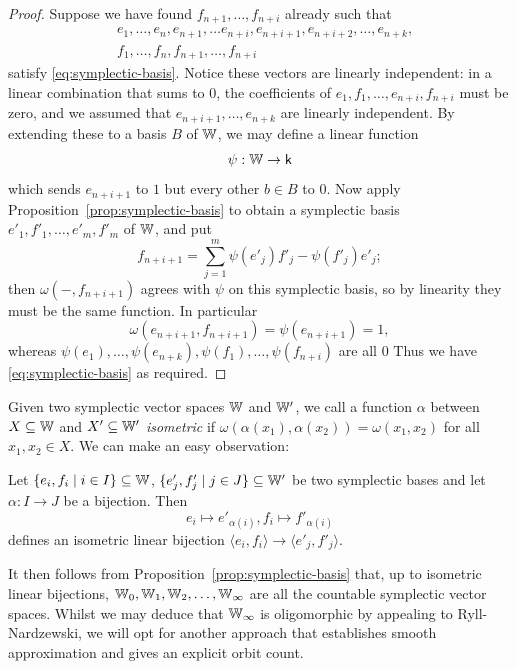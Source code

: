 \begin{proof}
    Suppose we have found $f_{n+1}, \ldots, f_{n+i}$ already such that
    \begin{align*}
        &e_1, \ldots, e_n, e_{n+1}, \ldots e_{n+i}, e_{n+i+1}, e_{n+i+2}, \ldots, e_{n+k},\\ 
        &f_1, \ldots, f_n, f_{n+1}, \ldots, f_{n+i}
    \end{align*}
    satisfy \eqref{eq:symplectic-basis}.
    Notice these vectors are linearly independent:
    in a linear combination that sums to $0$,
    the coefficients of $e_1, f_1, \dots, e_{n+i}, f_{n+i}$ must be zero,
    and we assumed that $e_{n+i+1}, \dots, e_{n+k}$ are linearly independent.
    By extending these to a basis $B$ of $\mathbb{W}$, we may define a linear function 
    \[
        \psi : \mathbb{W} \to \mathsf{k}
    \]
    which sends $e_{n+i+1}$ to $1$ but every other $b \in B$ to $0$.
    Now apply Proposition~\ref{prop:symplectic-basis} to obtain a symplectic basis $e'_1, f'_1, \dots, e'_m, f'_m$ of $\mathbb{W}$, and put
    \[
        f_{n+i+1} = \sum_{j=1}^m \psi(e'_j) f'_j - \psi(f'_j) e'_j;
    \]
    then $\omega(-, f_{n+i+1})$ agrees with $\psi$ on this symplectic basis, so by linearity they must be the same function.
    In particular 
    \[
        \omega(e_{n+i+1}, f_{n+i+1}) = \psi(e_{n+i+1}) = 1,
    \]
    whereas $\psi(e_1), \dots, \psi(e_{n+k}), \psi(f_1), \dots, \psi(f_{n+i})$ are all $0$
    Thus we have \eqref{eq:symplectic-basis} as required.
\end{proof}

Given two symplectic vector spaces $\mathbb{W}$ and $\mathbb{W}'$,
we call a function $\alpha$ between $X \subseteq \mathbb{W}$ and $X' \subseteq \mathbb{W}'$ \emph{isometric} if 
$\omega(\alpha(x_1), \alpha(x_2)) = \omega(x_1, x_2)$ for all $x_1, x_2 \in X$.
We can make an easy observation:
\begin{lemma}\label{lem:symplectic-basis-gives-isometry}
Let $\{e_i, f_i \mid i \in I\} \subseteq \mathbb{W}$, $\{e'_j, f'_j \mid j \in J\} \subseteq \mathbb{W}'$ be two symplectic bases
and let $\alpha : I \to J$ be a bijection.
Then 
\[
    e_i \mapsto e'_{\alpha(i)}, f_i \mapsto f'_{\alpha(i)}
\]
defines an isometric linear bijection $\langle e_i, f_i \rangle \to \langle e'_j, f'_j \rangle$.
\end{lemma}

It then follows from Proposition~\ref{prop:symplectic-basis} that, 
up to isometric linear bijections, 
$\mathbb{W}_0, \mathbb{W}_1, \mathbb{W}_2, \ldots, \mathbb{W}_\infty$ are all the countable symplectic vector spaces.
Whilst we may deduce that $\mathbb{W}_\infty$ is oligomorphic by appealing to Ryll-Nardzewski,
we will opt for another approach that establishes smooth approximation and gives an explicit orbit count.

